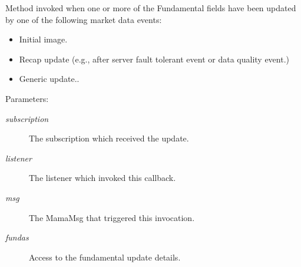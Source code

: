 Method invoked when one or more of the Fundamental fields have been updated by one of the following market data events:\begin{itemize}
\item Initial image. \end{itemize}


\begin{itemize}
\item Recap update (e.g., after server fault tolerant event or data quality event.)\item Generic update..\end{itemize}


\begin{Desc}
\item[Parameters:]
\begin{description}
\item[{\em subscription}]The subscription which received the update. \item[{\em listener}]The listener which invoked this callback. \item[{\em msg}]The Mama\-Msg that triggered this invocation. \item[{\em fundas}]Access to the fundamental update details. \end{description}
\end{Desc}
